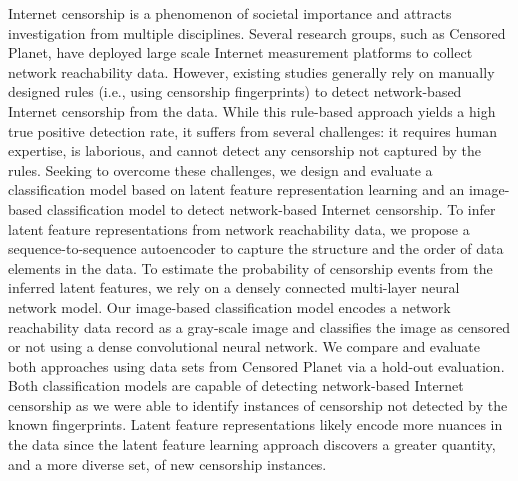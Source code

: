 Internet censorship is a phenomenon of societal importance and attracts
investigation from multiple disciplines.  Several research groups, such as Censored Planet, have deployed large scale Internet
measurement platforms to collect network
reachability data.  However, existing studies generally rely on manually
designed rules (i.e., using censorship fingerprints) to detect 
network-based Internet censorship
from the data.  While this rule-based approach yields a high true positive
detection rate, it suffers from several challenges: it requires human
expertise, is laborious, and cannot detect any censorship not captured by the
rules.  Seeking to overcome these challenges, we design and evaluate a classification model based on  latent
feature representation learning and an image-based classification model to detect
network-based Internet censorship. To infer latent feature representations from
network reachability data, we propose a sequence-to-sequence autoencoder to
capture the structure and the order of data elements in the data. To estimate
the probability of censorship events from the inferred latent features, we rely on a densely connected
multi-layer neural network model.  Our image-based classification model encodes a network reachability data
record as a gray-scale image and classifies the image as censored or not using a
dense convolutional neural network.  We compare and evaluate both approaches using data
sets from Censored Planet via a hold-out evaluation.  Both
classification models are capable of detecting network-based Internet
censorship as we were able to identify instances of
censorship not detected by the known fingerprints. Latent feature representations likely encode more nuances in the data since the latent feature learning approach discovers  a greater quantity, and a more
diverse set, of new censorship instances.


